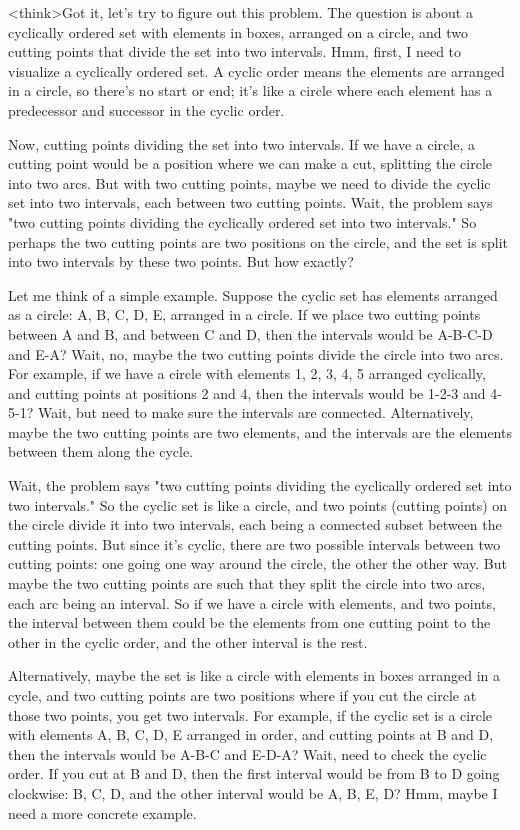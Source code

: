 <think>Got it, let's try to figure out this problem. The question is about a cyclically ordered set with elements in boxes, arranged on a circle, and two cutting points that divide the set into two intervals. Hmm, first, I need to visualize a cyclically ordered set. A cyclic order means the elements are arranged in a circle, so there's no start or end; it's like a circle where each element has a predecessor and successor in the cyclic order.

Now, cutting points dividing the set into two intervals. If we have a circle, a cutting point would be a position where we can make a cut, splitting the circle into two arcs. But with two cutting points, maybe we need to divide the cyclic set into two intervals, each between two cutting points. Wait, the problem says "two cutting points dividing the cyclically ordered set into two intervals." So perhaps the two cutting points are two positions on the circle, and the set is split into two intervals by these two points. But how exactly?

Let me think of a simple example. Suppose the cyclic set has elements arranged as a circle: A, B, C, D, E, arranged in a circle. If we place two cutting points between A and B, and between C and D, then the intervals would be A-B-C-D and E-A? Wait, no, maybe the two cutting points divide the circle into two arcs. For example, if we have a circle with elements 1, 2, 3, 4, 5 arranged cyclically, and cutting points at positions 2 and 4, then the intervals would be 1-2-3 and 4-5-1? Wait, but need to make sure the intervals are connected. Alternatively, maybe the two cutting points are two elements, and the intervals are the elements between them along the cycle.

Wait, the problem says "two cutting points dividing the cyclically ordered set into two intervals." So the cyclic set is like a circle, and two points (cutting points) on the circle divide it into two intervals, each being a connected subset between the cutting points. But since it's cyclic, there are two possible intervals between two cutting points: one going one way around the circle, the other the other way. But maybe the two cutting points are such that they split the circle into two arcs, each arc being an interval. So if we have a circle with elements, and two points, the interval between them could be the elements from one cutting point to the other in the cyclic order, and the other interval is the rest.

Alternatively, maybe the set is like a circle with elements in boxes arranged in a cycle, and two cutting points are two positions where if you cut the circle at those two points, you get two intervals. For example, if the cyclic set is a circle with elements A, B, C, D, E arranged in order, and cutting points at B and D, then the intervals would be A-B-C and E-D-A? Wait, need to check the cyclic order. If you cut at B and D, then the first interval would be from B to D going clockwise: B, C, D, and the other interval would be A, B, E, D? Hmm, maybe I need a more concrete example.

